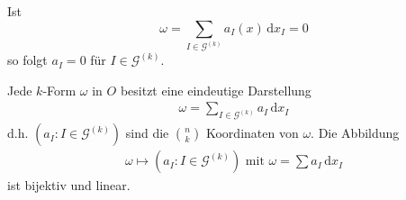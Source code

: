 \begin{theorem}[Satz] \label{thm:12.11}
  \begin{enum-arab}
    \item Ist \[ \omega = \sum\limits_{I \in \mathcal{G}^{(k)}} a_I(x) \, \mathrm{d}x_I = 0 \] so folgt $a_I = 0$ für $I \in \mathcal{G}^{(k)}$.
    
    \item Jede $k$-Form $\omega$ in $O$ besitzt eine eindeutige Darstellung
    \begin{align*}
      \omega = \sum\limits_{I \in \mathcal{G}^{(k)}} a_I \, \mathrm{d}x_I
    \end{align*}
    d.h. $(a_I : I \in \mathcal{G}^{(k)})$ sind die $\binom{n}{k}$ Koordinaten von $\omega$. Die Abbildung
    \begin{align*}
      \omega \mapsto (a_I : I \in \mathcal{G}^{(k)}) \text{ mit } \omega = \sum a_I \, \mathrm{d}x_I
    \end{align*}
    ist bijektiv und linear.
  \end{enum-arab}
  

\end{theorem}
